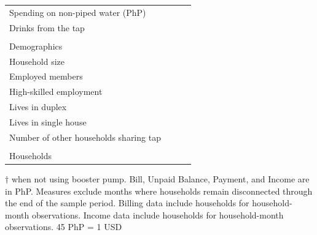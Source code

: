 \documentclass[12pt,table]{article}
\begin{document}
\begin{table}[h!]
\begin{threeparttable}
\begin{tabular}{@{}l*{1}{KKK}@{}}
\hspace{1em}Spending on non-piped water (PhP) &  \\
\hspace{1em}Drinks from the tap &  \\
\\[-.5em]
Demographics \\[.5em]
\hspace{1em}Household size &  \\
\hspace{1em}Employed members &  \\
\hspace{1em}High-skilled employment &  \\
\hspace{1em}Lives in duplex&  \\
\hspace{1em}Lives in single house&  \\
\hspace{1em}Number of other households sharing tap&  \\
\\[-.5em]
Households &  \\
\bottomrule
\end{tabular}
\begin{tablenotes}
\footnotesize
\item  $\dagger$ when not using booster pump.  Bill, Unpaid Balance, Payment, and Income are in PhP.  Measures exclude months where households remain disconnected through the end of the sample period.  Billing data include households for household-month observations.  Income data include households for household-month observations.  45 PhP = 1 USD \,\,
\end{tablenotes}
\end{threeparttable}
\end{table}
\end{document}
